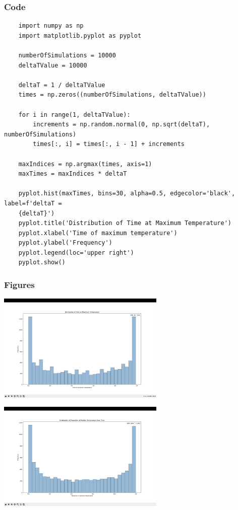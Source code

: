 \documentclass{article}
\begin{document}
\subsubsection*{Code}

\begin{verbatim}
    import numpy as np
    import matplotlib.pyplot as pyplot
    
    numberOfSimulations = 10000
    deltaTValue = 10000
    
    deltaT = 1 / deltaTValue                                                            
    times = np.zeros((numberOfSimulations, deltaTValue))                                          
    
    for i in range(1, deltaTValue):                                                     
        increments = np.random.normal(0, np.sqrt(deltaT), numberOfSimulations)          
        times[:, i] = times[:, i - 1] + increments
    
    maxIndices = np.argmax(times, axis=1)
    maxTimes = maxIndices * deltaT
    
    pyplot.hist(maxTimes, bins=30, alpha=0.5, edgecolor='black', label=f'deltaT = 
    {deltaT}')
    pyplot.title('Distribution of Time at Maximum Temperature')
    pyplot.xlabel('Time of maximum temperature')
    pyplot.ylabel('Frequency')
    pyplot.legend(loc='upper right')
    pyplot.show() 
\end{verbatim}

\subsubsection*{Figures}

\includegraphics[width=0.6\textwidth]{q1_p2_f1.png}

\includegraphics[width=0.6\textwidth]{q1_p1_f2.png}\\
\end{document}
